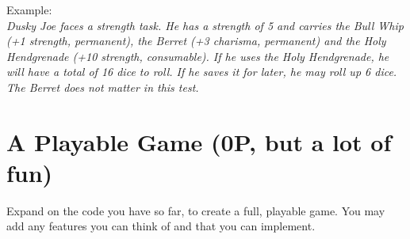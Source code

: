 \documentclass[
	english,
	fontsize=10pt,
	parskip=half,
	titlepage=true,
	DIV=12
]{scrartcl}
\begin{document}
Example:\\
\emph{Dusky Joe faces a strength task. He has a strength of 5 and carries the Bull Whip (+1 strength, permanent), the Berret (+3 charisma, permanent) and the Holy Hendgrenade (+10 strength, consumable). If he uses the Holy Hendgrenade, he will have a total of 16 dice to roll. If he saves it for later, he may roll up 6 dice. The Berret does not matter in this test.}

\section{A Playable Game (0\;P, but a lot of fun)}
Expand on the code you have so far, to create a full, playable game. You may add any features you can think of and that you can implement.
\end{document}
